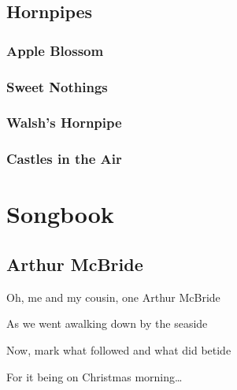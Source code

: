\documentclass[letterpaper,10pt,english]{sphinxmanual}
\begin{document}
\section{Hornpipes}
\label{\detokenize{Other Tunes/Hornpipes:hornpipes}}\label{\detokenize{Other Tunes/Hornpipes::doc}}

\subsection{Apple Blossom}
\label{\detokenize{Other Tunes/Hornpipes:apple-blossom}}
\noindent{}


\subsection{Sweet Nothings}
\label{\detokenize{Other Tunes/Hornpipes:sweet-nothings}}
\noindent{}


\subsection{Walsh’s Hornpipe}
\label{\detokenize{Other Tunes/Hornpipes:walsh-s-hornpipe}}
\noindent{}


\subsection{Castles in the Air}
\label{\detokenize{Other Tunes/Hornpipes:castles-in-the-air}}
\noindent{}


\chapter{Songbook}
\label{\detokenize{Songs/index:songbook}}\label{\detokenize{Songs/index::doc}}

\section{Arthur McBride}
\label{\detokenize{Songs/Arthur McBride:arthur-mcbride}}\label{\detokenize{Songs/Arthur McBride::doc}}
\noindent{}

\begin{DUlineblock}{0em}
\item[] Oh, me and my cousin, one Arthur McBride
\item[] As we went a\sphinxhyphen{}walking down by the seaside
\item[] Now, mark what followed and what did betide
\item[] For it being on Christmas morning…
\end{DUlineblock}
\end{document}
